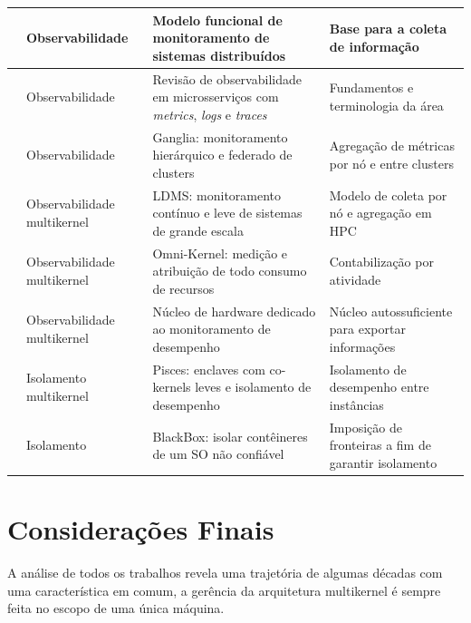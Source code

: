 \begin{small}
\begin{longtable}{p{3cm} p{2.5cm} p{4.75cm} p{3.75cm}}
        \citet{mansourisamani1993monitoring} & Observabilidade & Modelo funcional de monitoramento de sistemas distribuídos & Base para a coleta de informação \\
        \midrule
        \citet{faseeha2025observability} & Observabilidade & Revisão de observabilidade em microsserviços com \textit{metrics}, \textit{logs} e \textit{traces} & Fundamentos e terminologia da área \\
        \midrule
        \citet{massie2004ganglia} & Observabilidade & Ganglia: monitoramento hierárquico e federado de clusters & Agregação de métricas por nó e entre clusters \\
        \midrule
        \citet{agelastos2014ldms} & Observabilidade multikernel & LDMS: monitoramento contínuo e leve de sistemas de grande escala & Modelo de coleta por nó e agregação em HPC \\
        \midrule
        \citet{kvalnes2015omni} & Observabilidade multikernel & Omni-Kernel: medição e atribuição de todo consumo de recursos & Contabilização por atividade \\
        \midrule
        \citet{west2009coremonitors} & Observabilidade multikernel & Núcleo de hardware dedicado ao monitoramento de desempenho & Núcleo autossuficiente para exportar informações \\
        \midrule

        \citet{ouyang2015pisces} & Isolamento multikernel & Pisces: enclaves com co-kernels leves e isolamento de desempenho & Isolamento de desempenho entre instâncias \\
        \midrule
        \citet{vanthof2022blackbox} & Isolamento & BlackBox: isolar contêineres de um SO não confiável & Imposição de fronteiras a fim de garantir isolamento \\

    \end{longtable}
\end{small}

\section{Considerações Finais}\label{sec:consideracoes-finais}

A análise de todos os trabalhos revela uma trajetória de algumas décadas com uma característica em comum, a gerência
da arquitetura multikernel é sempre feita no escopo de uma única máquina.

